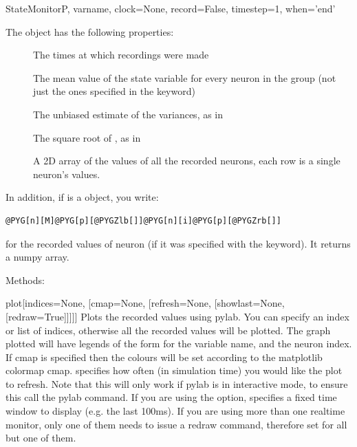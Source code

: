 \documentclass[letterpaper,10pt,english]{manual}
\begin{document}
\begin{classdesc}{StateMonitor}{P, varname, clock=None, record=False, timestep=1, when='end'}
\begin{description}
\end{description}

The \hyperlink{brian.StateMonitor}{} object has the following properties:
\begin{description}
\item[] \leavevmode
The times at which recordings were made

\item[] \leavevmode
The mean value of the state variable for every neuron in the
group (not just the ones specified in the  keyword)

\item[] \leavevmode
The unbiased estimate of the variances, as in 

\item[] \leavevmode
The square root of , as in 

\item[] \leavevmode
A 2D array of the values of all the recorded neurons, each row is a
single neuron's values.

\end{description}

In addition, if  is a \hyperlink{brian.StateMonitor}{} object, you write:

\begin{Verbatim}[commandchars=@\[\]]
@PYG[n][M]@PYG[p][@PYGZlb[]]@PYG[n][i]@PYG[p][@PYGZrb[]]
\end{Verbatim}

for the recorded values of neuron  (if it was specified with the
 keyword). It returns a numpy array.

Methods:

\hypertarget{brian.StateMonitor.plot}{}\begin{methoddesc}{plot}{{[}indices=None, {[}cmap=None, {[}refresh=None, {[}showlast=None, {[}redraw=True{]}{]}{]}{]}{]}}
Plots the recorded values using pylab. You can specify an index or
list of indices, otherwise all the recorded values will be plotted.
The graph plotted will have legends of the form  for
 the variable name, and  the neuron index. If cmap is
specified then the colours will be set according to the matplotlib
colormap cmap.  specifies how often (in simulation time)
you would like the plot to refresh. Note that this will only work if
pylab is in interactive mode, to ensure this call the pylab 
command. If you are using the  option,  specifies
a fixed time window to display (e.g. the last 100ms).
If you are using more than one realtime monitor, only one of them needs
to issue a redraw command, therefore set  for all but
one of them.


\end{methoddesc}
\end{classdesc}
\end{document}
